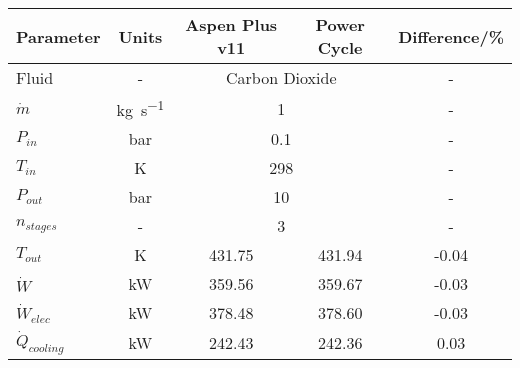 \begin{tabular}{|p{2.5cm} c c c c|}
    \hline
    \rowcolor{bluepoli!40} %
    \textbf{Parameter} & \textbf{Units} & \textbf{Aspen Plus v11} & \textbf{Power Cycle} & \textbf{Difference/\unit{\percent}} \T\B \\
    \hline \hline
    Fluid  & - & \multicolumn{2}{c}{Carbon Dioxide} & - \T\B\\
    \(\Dot{m}\)  & \unit{\kg\per\s} & \multicolumn{2}{c}{\num{1}} & - \T\B\\
    \(P_{in}\) & \unit{\bar} & \multicolumn{2}{c}{\num{0.1}} & - \T\B\\
    \(T_{in}\) & \unit{\K} & \multicolumn{2}{c}{\num{298}} & - \T\B\\
    \(P_{out}\) & \unit{\bar} & \multicolumn{2}{c}{\num{10}} & - \T\B\\   
    \(n_{stages}\) & - & \multicolumn{2}{c}{\num{3}} & - \T\B\\ 
    \hline\hline
    \(T_{out}\) & \unit{\K} & 431.75 & 431.94 & -0.04 \T\B\\
    \(\Dot{W}\) & \unit{\kilo\watt} & 359.56 & 359.67 & -0.03 \T\B\\
    \(\Dot{W}_{elec}\) & \unit{\kilo\watt} & 378.48 & 378.60 & -0.03 \T\B\\
    \(\Dot{Q}_{cooling}\) & \unit{\kilo\watt} & 242.43 & 242.36 & 0.03 \T\B\\
    \hline
\end{tabular}